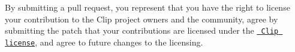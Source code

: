 By submitting a pull request, you represent that you have the right to license your contribution to the Clip project owners and the community, agree by submitting the patch that your contributions are licensed under the \href{https://raw.githubusercontent.com/dacap/clip/main/LICENSE.txt}{\texttt{ Clip license}}, and agree to future changes to the licensing. 